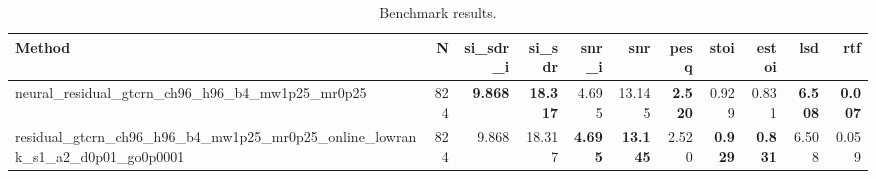 \begin{table}[t]
\centering
\caption{Benchmark results.}
\label{tab:bench}
\begin{tabular}{lrrrrrrrrrr}
\toprule
Method & N & si\_sdr\_i & si\_sdr & snr\_i & snr & pesq & stoi & estoi & lsd & rtf \\
\midrule
neural_residual_gtcrn_ch96_h96_b4_mw1p25_mr0p25 & 824 & \textbf{9.868} & \textbf{18.317} & 4.695 & 13.145 & \textbf{2.520} & 0.929 & 0.831 & \textbf{6.508} & \textbf{0.007} \\
residual_gtcrn_ch96_h96_b4_mw1p25_mr0p25_online_lowrank_s1_a2_d0p01_go0p0001 & 824 & 9.868 & 18.317 & \textbf{4.695} & \textbf{13.145} & 2.520 & \textbf{0.929} & \textbf{0.831} & 6.508 & 0.059 \\
\bottomrule
\end{tabular}
\end{table}
